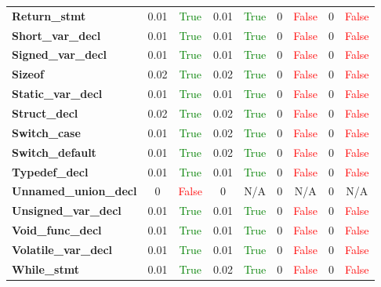 \documentclass{article}
\begin{document}
\begin{xltabular}{\textwidth}{lcccccccc}
\textbf{{\fontsize{10}{12}\selectfont Return\_stmt}}& 0.01&\textcolor{green}{True}& 0.01&\textcolor{green}{True}& 0&\textcolor{red}{False}& 0&\textcolor{red}{False} \\[0.5ex]
\textbf{{\fontsize{10}{12}\selectfont Short\_var\_decl}}& 0.01&\textcolor{green}{True}& 0.01&\textcolor{green}{True}& 0&\textcolor{red}{False}& 0&\textcolor{red}{False} \\[0.5ex]
\textbf{{\fontsize{10}{12}\selectfont Signed\_var\_decl}}& 0.01&\textcolor{green}{True}& 0.01&\textcolor{green}{True}& 0&\textcolor{red}{False}& 0&\textcolor{red}{False} \\[0.5ex]
\textbf{{\fontsize{10}{12}\selectfont Sizeof}}& 0.02&\textcolor{green}{True}& 0.02&\textcolor{green}{True}& 0&\textcolor{red}{False}& 0&\textcolor{red}{False} \\[0.5ex]
\textbf{{\fontsize{10}{12}\selectfont Static\_var\_decl}}& 0.01&\textcolor{green}{True}& 0.01&\textcolor{green}{True}& 0&\textcolor{red}{False}& 0&\textcolor{red}{False} \\[0.5ex]
\textbf{{\fontsize{10}{12}\selectfont Struct\_decl}}& 0.02&\textcolor{green}{True}& 0.02&\textcolor{green}{True}& 0&\textcolor{red}{False}& 0&\textcolor{red}{False} \\[0.5ex]
\textbf{{\fontsize{10}{12}\selectfont Switch\_case}}& 0.01&\textcolor{green}{True}& 0.02&\textcolor{green}{True}& 0&\textcolor{red}{False}& 0&\textcolor{red}{False} \\[0.5ex]
\textbf{{\fontsize{10}{12}\selectfont Switch\_default}}& 0.01&\textcolor{green}{True}& 0.02&\textcolor{green}{True}& 0&\textcolor{red}{False}& 0&\textcolor{red}{False} \\[0.5ex]
\textbf{{\fontsize{10}{12}\selectfont Typedef\_decl}}& 0.01&\textcolor{green}{True}& 0.01&\textcolor{green}{True}& 0&\textcolor{red}{False}& 0&\textcolor{red}{False} \\[0.5ex]
\textbf{{\fontsize{10}{12}\selectfont Unnamed\_union\_decl}}& 0&\textcolor{red}{False}& 0&N/A& 0&N/A& 0&N/A \\[0.5ex]
\textbf{{\fontsize{10}{12}\selectfont Unsigned\_var\_decl}}& 0.01&\textcolor{green}{True}& 0.01&\textcolor{green}{True}& 0&\textcolor{red}{False}& 0&\textcolor{red}{False} \\[0.5ex]
\textbf{{\fontsize{10}{12}\selectfont Void\_func\_decl}}& 0.01&\textcolor{green}{True}& 0.01&\textcolor{green}{True}& 0&\textcolor{red}{False}& 0&\textcolor{red}{False} \\[0.5ex]
\textbf{{\fontsize{10}{12}\selectfont Volatile\_var\_decl}}& 0.01&\textcolor{green}{True}& 0.01&\textcolor{green}{True}& 0&\textcolor{red}{False}& 0&\textcolor{red}{False} \\[0.5ex]
\textbf{{\fontsize{10}{12}\selectfont While\_stmt}}& 0.01&\textcolor{green}{True}& 0.02&\textcolor{green}{True}& 0&\textcolor{red}{False}& 0&\textcolor{red}{False} \\[0.5ex]
\bottomrule
\end{xltabular}
\end{document}
